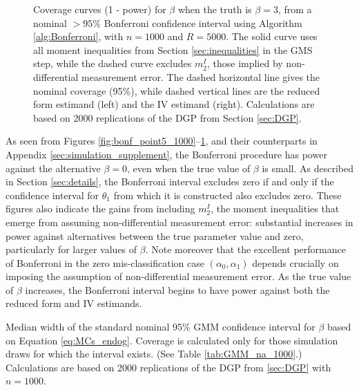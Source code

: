 \begin{figure}[h]
  \centering
  \caption{Coverage curves (1 - power) for $\beta$ when the truth is $\beta = 3$, from a nominal $>95\%$ Bonferroni confidence interval using Algorithm \ref{alg:Bonferroni}, with $n = 1000$ and $R = 5000$. The solid curve uses all moment inequalities from Section \ref{sec:inequalities} in the GMS step, while the dashed curve excludes $m_{2}^I$, those implied by non-differential measurement error. The dashed horizontal line gives the nominal coverage (95\%), while dashed vertical lines are the reduced form estimand (left) and the IV estimand (right). Calculations are based on 2000 replications of the DGP from Section \ref{sec:DGP}.}
  \label{fig:bonf_3_1000}
\end{figure}

As seen from Figures \ref{fig:bonf_point5_1000}--\ref{fig:bonf_3_1000}, and their counterparts in Appendix \ref{sec:simulation_supplement}, the Bonferroni procedure has power against the alternative $\beta = 0$, even when the true value of $\beta$ is small.
As described in Section \ref{sec:details}, the Bonferroni interval excludes zero if and only if the confidence interval for $\theta_1$ from which it is constructed also excludes zero.
These figures also indicate the gains from including $m_2^I$, the moment inequalities that emerge from assuming non-differential measurement error: substantial increases in power against alternatives between the true parameter value and zero, particularly for larger values of $\beta$.
Note moreover that the excellent performance of Bonferroni in the zero mis-classification case $(\alpha_0, \alpha_1)$ depends crucially on imposing the assumption of non-differential measurement error.
As the true value of $\beta$ increases, the Bonferroni interval begins to have power against both the reduced form and IV estimands.

\begin{table}[htbp]
  \small
  \centering
  
  \caption{Median width of the standard nominal 95\% GMM confidence interval for $\beta$ based on Equation \ref{eq:MCs_endog}. Coverage is calculated only for those simulation draws for which the interval exists. (See Table \ref{tab:GMM_na_1000}.) Calculations are based on 2000 replications of the DGP from \ref{sec:DGP} with $n = 1000$.} 
  \label{tab:GMM_width_1000}
\end{table}

